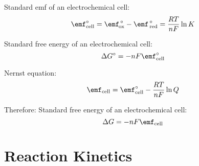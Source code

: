 \documentclass[10pt]{article}
\begin{document}
Standard emf of an electrochemical cell:
\begin{equation*}
\textnormal{\Enotcell} = \textnormal{$\emf^{\hspace*{.5mm}\circ}_{\hspace*{-.3mm}\textnormal{ox}}$} - \textnormal{$\emf^{\hspace*{.5mm}\circ}_{\hspace*{.5mm}\textnormal{red}}$}  = \frac{RT}{nF} \ln K
\end{equation*}

Standard free energy of an electrochemical cell:
\begin{equation*}
\Delta G\not = -nF\textnormal{\Enotcell}
\end{equation*}

Nernst equation:
\begin{equation*}
\textnormal{\Ecell} = \textnormal{\Enotcell} - \frac{RT}{nF}\ln Q
\end{equation*}

Therefore:
Standard free energy of an electrochemical cell:
\begin{equation*}
\Delta G = -nF\textnormal{\Ecell}
\end{equation*}

\section{Reaction Kinetics}
\end{document}
